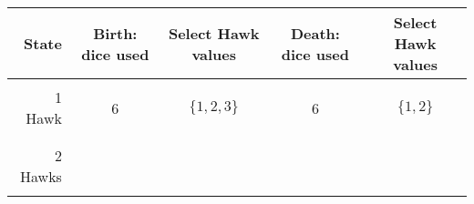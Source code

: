 \documentclass{article}
\begin{document}
\begin{center}
    \begin{tabular}{r|c|c|c|c}
        \toprule
        State & Birth: dice used & Select Hawk values   & Death: dice used &
        Select Hawk values \\
        \midrule
                        &   &                 &   & \\
        1 Hawk          & 6 & \(\{1, 2, 3\}\) & 6 & \(\{1, 2\}\) \\
                        &   &                 &   & \\
        \midrule
                        &   &                 &   & \\
        2 Hawks         &   &                 &   & \\
                        &   &                 &   & \\
        \bottomrule
    \end{tabular}
\end{center}


\subsection*{}
\end{document}
